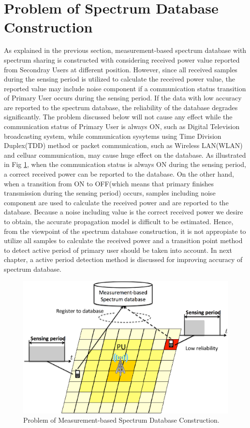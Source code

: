\section{Problem of Spectrum Database Construction }
As explained in the previous section, measurement-based spectrum database with spectrum sharing is constructed with considering received power value reported from Secondray Users at different position. However, since all received samples during the sensing period is utilized to calculate the received power value, the reported value may include noise component if a communication status transition of Primary User occurs during the sensing period. If the data with low accuracy are reported to the spectrum database, the reliability of the database degrades significantly. The problem discussed below will not cause any effect while the communication status of Primary User is always ON, such as Digital Television broadcasting system, while communication sysytems using Time Division Duplex(TDD) method or packet communication, such as Wireless LAN(WLAN) and celluar communication, may cause huge effect on the database. As illustrated in Fig \ref{fig:transition}, when the communication status is always ON during the sensing period, a correct received power can be reported to the database. On the other hand, when a transition from ON to OFF(which means that primary finishes transmission during the sensing period) occurs, samples including noise component are used to calculate the received power and are reported to the database. Because a noise including value is the correct received power we desire to obtain, the accurate propagation model is difficult to be estimated. Hence, from the viewpoint of the spectrum database construction, it is not appropiate to utilize all samples to calculate the received power and a transition point method to detect active period of primary user should be taken into account. In next chapter, a active period detection method is discussed for improving accuracy of spectrum database.

\begin{figure}[!htp]
\begin{center}
\includegraphics[width=120mm,clip]{transition.eps}
\caption{Problem of Measurement-based Spectrum Database Construction.}
\label{fig:transition}
\end{center}
\end{figure}
